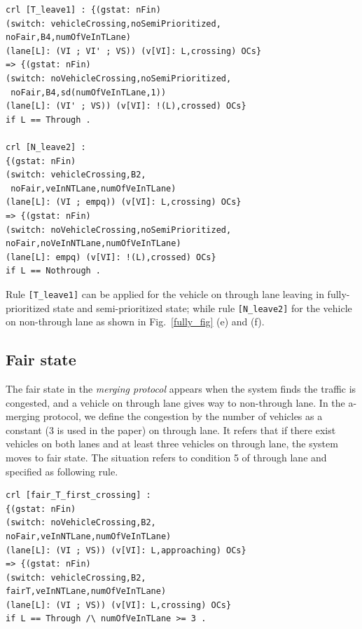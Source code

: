 \documentclass[10pt, conference, compsocconf]{IEEEtran}
\begin{document}
\begin{footnotesize}
\begin{verbatim}
crl [T_leave1] : {(gstat: nFin) 
(switch: vehicleCrossing,noSemiPrioritized,
noFair,B4,numOfVeInTLane) 
(lane[L]: (VI ; VI' ; VS)) (v[VI]: L,crossing) OCs} 
=> {(gstat: nFin) 
(switch: noVehicleCrossing,noSemiPrioritized,
 noFair,B4,sd(numOfVeInTLane,1)) 
(lane[L]: (VI' ; VS)) (v[VI]: !(L),crossed) OCs} 
if L == Through .
 
crl [N_leave2] : 
{(gstat: nFin) 
(switch: vehicleCrossing,B2,
 noFair,veInNTLane,numOfVeInTLane) 
(lane[L]: (VI ; empq)) (v[VI]: L,crossing) OCs} 
=> {(gstat: nFin) 
(switch: noVehicleCrossing,noSemiPrioritized,
noFair,noVeInNTLane,numOfVeInTLane) 
(lane[L]: empq) (v[VI]: !(L),crossed) OCs} 
if L == Nothrough .
\end{verbatim}
\end{footnotesize}

\noindent Rule \verb![T_leave1]! can be applied for the vehicle on through lane leaving in fully-prioritized state and semi-prioritized state; while rule \verb![N_leave2]! for the vehicle on non-through lane as shown in Fig.~\ref{fully_fig} (e) and (f).


\subsection{Fair state}

The fair state in the \textit{merging protocol} appears when the system finds the traffic is congested, and a vehicle on through lane gives way to non-through lane. 
In the a-merging protocol, we define the congestion by the number of vehicles as a constant (3 is used in the paper) on through lane. 
It refers that if there exist vehicles on both lanes and at least three vehicles on through lane, the system moves to fair state.
The situation refers to condition 5 of through lane and specified as following rule.


\begin{footnotesize}
\begin{verbatim}
crl [fair_T_first_crossing] : 
{(gstat: nFin) 
(switch: noVehicleCrossing,B2,
noFair,veInNTLane,numOfVeInTLane) 
(lane[L]: (VI ; VS)) (v[VI]: L,approaching) OCs} 
=> {(gstat: nFin) 
(switch: vehicleCrossing,B2,
fairT,veInNTLane,numOfVeInTLane) 
(lane[L]: (VI ; VS)) (v[VI]: L,crossing) OCs} 
if L == Through /\ numOfVeInTLane >= 3 .
\end{verbatim}
\end{footnotesize}
\end{document}
